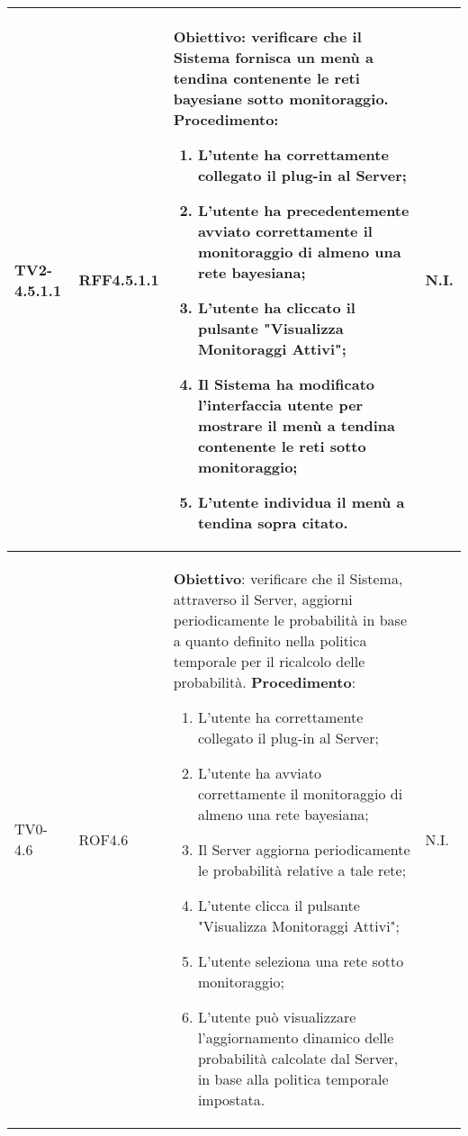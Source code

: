 \begin{longtable}{|C{.15\textwidth}|C{.13\textwidth}|m{.52\textwidth}|C{.08\textwidth}|}
TV2-4.5.1.1 & RFF4.5.1.1 &
	\textbf{Obiettivo}: verificare che il Sistema fornisca un menù a  tendina contenente le reti bayesiane sotto monitoraggio. \newline
	\textbf{Procedimento}:
	\begin{enumerate}
		\item L'utente ha correttamente collegato il plug-in al Server;
		\item L'utente ha precedentemente avviato correttamente il monitoraggio di almeno una rete bayesiana;
		\item L'utente ha cliccato il pulsante "Visualizza Monitoraggi Attivi";
		\item Il Sistema ha modificato l'interfaccia utente per mostrare il menù a tendina contenente le reti sotto monitoraggio;
		\item L'utente individua il menù a tendina sopra citato.
	\end{enumerate}
	& N.I. \\
\hline

TV0-4.6 & ROF4.6 &
	\textbf{Obiettivo}: verificare che il Sistema, attraverso il Server, aggiorni periodicamente le probabilità in base a quanto definito nella politica temporale per il ricalcolo delle probabilità. \newline
	\textbf{Procedimento}:
	\begin{enumerate}
		\item L'utente ha correttamente collegato il plug-in al Server;
		\item L'utente ha avviato correttamente il monitoraggio di almeno una rete bayesiana;
		\item Il Server aggiorna periodicamente le probabilità relative a tale rete;
		\item L'utente clicca il pulsante "Visualizza Monitoraggi Attivi";
		\item L'utente seleziona una rete sotto monitoraggio;
		\item L'utente può visualizzare l'aggiornamento dinamico delle probabilità calcolate dal Server, in base alla politica temporale impostata.
	\end{enumerate}
	& N.I. \\
\hline


\end{longtable}
